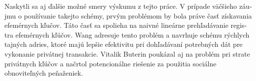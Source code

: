 \begin{otherlanguage}{slovak}
Naskytli sa aj ďalšie možné smery výskumu z tejto práce. V prípade väčšieho záujmu
o používanie takejto schémy, prvým problémom by bola práve časť získavania
efemérnych kľučov. Táto časť sa spolieha na naivné lineárne prehľadávanie
registra efemérnych kľúčov. Wang \cite{Wang2023} adresuje tento problém a navrhuje
schému rýchlych tajných adries, ktoré majú lepšie efektivitu pri dohľadávaní
potrebných dát pre vykonanie privátnej transakcie. Vitalik Buterin \cite{ButerinIncompleteGuide}
poukázal aj na problém pri strate privátnych kľúčov a načrtol potencionálne
riešenie za použitia sociálne obnoviteľných peňaženiek.

\end{otherlanguage}
